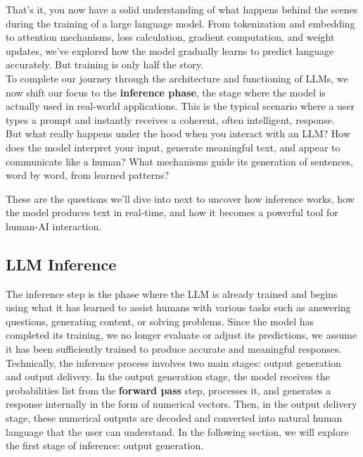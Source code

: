 \documentclass[12pt]{article}
\begin{document}
That’s it, you now have a solid understanding of what happens behind the scenes during the training of a large language model. From tokenization and embedding to attention mechanisms, loss calculation, gradient computation, and weight updates, we’ve explored how the model gradually learns to predict language accurately. But training is only half the story.\\To complete our journey through the architecture and functioning of LLMs, we now shift our focus to the \textbf{inference phase}, the stage where the model is actually used in real-world applications. This is the typical scenario where a user types a prompt and instantly receives a coherent, often intelligent, response.\\But what really happens under the hood when you interact with an LLM?
How does the model interpret your input, generate meaningful text, and appear to communicate like a human?
What mechanisms guide its generation of sentences, word by word, from learned patterns?

These are the questions we’ll dive into next to uncover how inference works, how the model produces text in real-time, and how it becomes a powerful tool for human-AI interaction.


\subsection{LLM Inference}
The inference step is the phase where the LLM is already trained and begins using what it has learned to assist humans with various tasks such as answering questions, generating content, or solving problems. Since the model has completed its training, we no longer evaluate or adjust its predictions, we assume it has been sufficiently trained to produce accurate and meaningful responses. Technically, the inference process involves two main stages: output generation and output delivery. In the output generation stage, the model receives the probabilities list from the \textbf{forward pass} step, processes it, and generates a response internally in the form of numerical vectors. Then, in the output delivery stage, these numerical outputs are decoded and converted into natural human language that the user can understand. In the following section, we will explore the first stage of inference: output generation.
\end{document}
